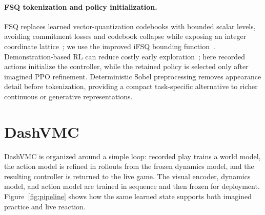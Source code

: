 \paragraph{FSQ tokenization and policy initialization.}
FSQ replaces learned vector-quantization codebooks with bounded scalar levels, avoiding commitment losses and codebook collapse while exposing an integer coordinate lattice~\citep{mentzer2024fsq}; we use the improved iFSQ bounding function~\citep{lin2026ifsq}.
Demonstration-based RL can reduce costly early exploration~\citep{hester2018deep,baker2022vpt}; here recorded actions initialize the controller, while the retained policy is selected only after imagined PPO refinement.
Deterministic Sobel preprocessing removes appearance detail before tokenization, providing a compact task-specific alternative to richer continuous or generative representations.

\FloatBarrier
\section{DashVMC}
\label{sec:method}

DashVMC is organized around a simple loop: recorded play trains a world model, the action model is refined in rollouts from the frozen dynamics model, and the resulting controller is returned to the live game.
The visual encoder, dynamics model, and action model are trained in sequence and then frozen for deployment.
Figure~\ref{fig:pipeline} shows how the same learned state supports both imagined practice and live reaction.

